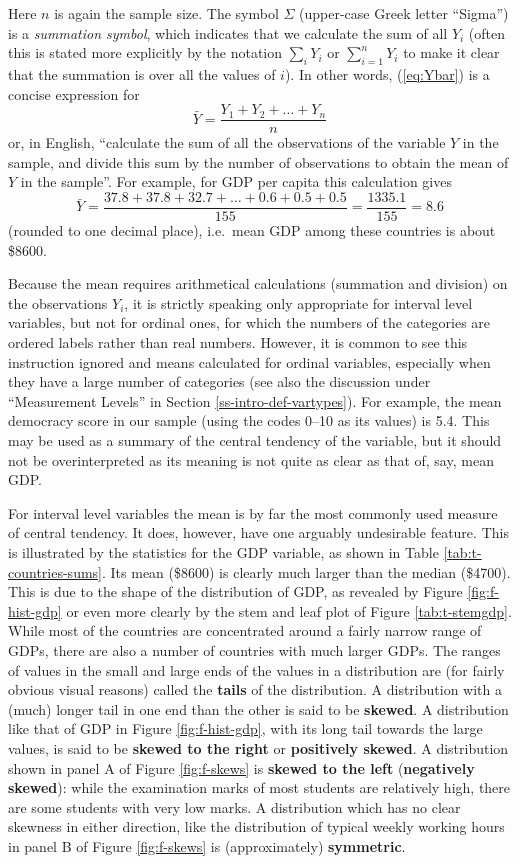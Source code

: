 \documentclass[11pt,a4paper,openany]{book}
\begin{document}
Here \(n\) is again the sample size. The symbol \(\Sigma\) (upper-case
Greek letter ``Sigma'') is a \emph{summation symbol}, which indicates
that we calculate the sum of all \(Y_{i}\) (often this is stated more
explicitly by the notation \(\sum_{i} Y_{i}\) or
\(\sum_{i=1}^{n} Y_{i}\) to make it clear that the summation is over all
the values of \(i\)). In other words, (\ref{eq:Ybar}) is a concise
expression for \[\bar{Y}= \frac{Y_{1}+Y_{2}+\dots+Y_{n}}{n}\] or, in
English, ``calculate the sum of all the observations of the variable
\(Y\) in the sample, and divide this sum by the number of observations
to obtain the mean of \(Y\) in the sample''. For example, for GDP per
capita this calculation gives
\[\bar{Y}= \frac{37.8+37.8+32.7+\dots+0.6+0.5+0.5}{155}
=\frac{1335.1}{155}=8.6\] (rounded to one decimal place), i.e.~mean GDP
among these countries is about \$8600.

Because the mean requires arithmetical calculations (summation and
division) on the observations \(Y_{i}\), it is strictly speaking only
appropriate for interval level variables, but not for ordinal ones, for
which the numbers of the categories are ordered labels rather than real
numbers. However, it is common to see this instruction ignored and means
calculated for ordinal variables, especially when they have a large
number of categories (see also the discussion under ``Measurement
Levels'' in Section \ref{ss-intro-def-vartypes}). For example, the mean
democracy score in our sample (using the codes 0--10 as its values) is
5.4. This may be used as a summary of the central tendency of the
variable, but it should not be overinterpreted as its meaning is not
quite as clear as that of, say, mean GDP.

For interval level variables the mean is by far the most commonly used
measure of central tendency. It does, however, have one arguably
undesirable feature. This is illustrated by the statistics for the GDP
variable, as shown in Table \ref{tab:t-countries-sums}. Its mean
(\$8600) is clearly much larger than the median (\$4700). This is due to
the shape of the distribution of GDP, as revealed by Figure
\ref{fig:f-hist-gdp} or even more clearly by the stem and leaf plot of
Figure \ref{tab:t-stemgdp}. While most of the countries are concentrated
around a fairly narrow range of GDPs, there are also a number of
countries with much larger GDPs. The ranges of values in the small and
large ends of the values in a distribution are (for fairly obvious
visual reasons) called the \textbf{tails} of the distribution. A
distribution with a (much) longer tail in one end than the other is said
to be \textbf{skewed}. A distribution like that of GDP in Figure
\ref{fig:f-hist-gdp}, with its long tail towards the large values, is
said to be \textbf{skewed to the right} or \textbf{positively skewed}. A
distribution shown in panel A of Figure \ref{fig:f-skews} is
\textbf{skewed to the left} (\textbf{negatively skewed}): while the
examination marks of most students are relatively high, there are some
students with very low marks. A distribution which has no clear skewness
in either direction, like the distribution of typical weekly working
hours in panel B of Figure \ref{fig:f-skews} is (approximately)
\textbf{symmetric}.
\end{document}

